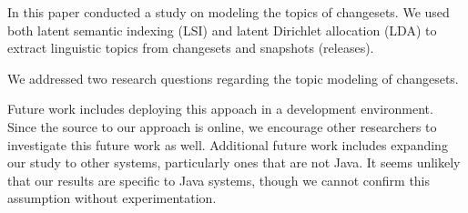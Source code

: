
In this paper conducted a study on modeling the topics of changesets.
We used both latent semantic indexing (LSI) and latent Dirichlet
allocation (LDA) to extract linguistic topics from changesets and
snapshots (releases).

We addressed two research questions regarding the topic modeling of changesets.


Future work includes deploying this appoach in a development environment.
Since the source to our approach is online, we encourage other researchers
to investigate this future work as well.
Additional future work includes expanding our study to other systems,
particularly ones that are not Java.
It seems unlikely that our results are specific to Java systems,
though we cannot confirm this assumption without experimentation.
